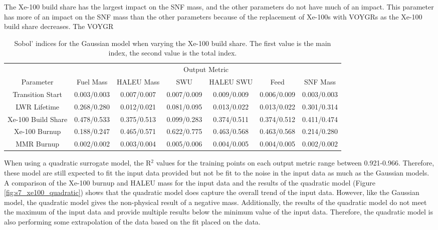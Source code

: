 The Xe-100 build share has the largest impact on the \gls{SNF} mass, and 
the other parameters do not have much of an impact. This parameter 
has more of an impact on the \gls{SNF} mass than the other parameters because 
of the replacement of Xe-100s with VOYGRs as the Xe-100 build share decreases. 
The VOYGR 

\begin{table}
    \centering
    \caption{Sobol' indices for the Gaussian model when varying the 
    Xe-100 build share. The first value is the 
    main index, the second value is the total index.}
    \label{tab:s7_sobol_xe100_gaussian}
    \begin{tabular}{c c c c c c c}
        \hline
        & \multicolumn{6}{c}{Output Metric} \\
        Parameter & Fuel Mass & HALEU Mass & SWU & HALEU SWU & Feed & SNF Mass \\
        \hline
        Transition Start & 0.003/0.003 & 0.007/0.007 & 0.007/0.009 &
                           0.009/0.009 & 0.006/0.009 & 0.003/0.003\\
        LWR Lifetime & 0.268/0.280 & 0.012/0.021 & 0.081/0.095 &
                       0.013/0.022 & 0.013/0.022 & 0.301/0.314\\
        Xe-100 Build Share & \cellcolor{green!25}0.478/0.533 & \cellcolor{green!25}0.375/0.513 & 0.099/0.283 &
        \cellcolor{green!25}0.374/0.511 & \cellcolor{green!25}0.374/0.512 & 0.411/0.474\\
        Xe-100 Burnup & 0.188/0.247 & \cellcolor{green!25}0.465/0.571 & \cellcolor{green!25}0.622/0.775 & 
        \cellcolor{green!25}0.463/0.568 & \cellcolor{green!25}0.463/0.568 & 0.214/0.280\\
        MMR Burnup & 0.002/0.002 & 0.003/0.004 & 0.005/0.006 & 
                     0.004/0.005 & 0.004/0.005 & 0.002/0.002\\
        \hline        
    \end{tabular}
\end{table}

When using a quadratic surrogate model, the R$^2$ values for the training points on 
each output metric range between 0.921-0.966. Therefore, these model are still expected to 
fit the input data provided but not be fit to the noise in the input data 
as much as the Gaussian models. A comparison of the Xe-100 burnup and \gls{HALEU} 
mass for the input data and the results of the quadratic model (Figure 
\ref{fig:s7_xe100_quadratic}) shows that the quadratic model does 
capture the overall trend of the input data. However, like the Gaussian model, 
the quadratic model gives the non-physical result of a negative mass. Additionally, 
the results of the quadratic model do not meet the maximum of the input data and 
provide multiple results below the minimum value of the input data. Therefore, 
the quadratic model is also performing some extrapolation of the data based on the 
fit placed on the data.

